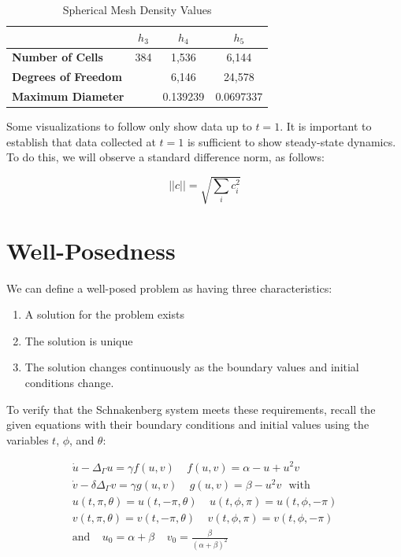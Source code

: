 \documentclass[12pt]{article}
\begin{document}
\begin{table}[H]
	\centering
	\caption{Spherical Mesh Density Values}\label{tab:refine}
	\begin{tabular}{|l|c|c|c|}
		\hline
		\textbf{}                   & $h_3$ & $h_4$    & $h_5$     \\ \hline
		\textbf{Number of Cells}    & 384   & 1,536    & 6,144     \\ \hline
		\textbf{Degrees of Freedom} &       & 6,146    & 24,578    \\ \hline
		\textbf{Maximum Diameter}   &       & 0.139239 & 0.0697337 \\ \hline
	\end{tabular}
\end{table}

Some visualizations to follow only show data up to $t=1$. It is important to establish that data collected at $t=1$ is sufficient to show steady-state dynamics. To do this, we will observe a standard difference norm, as follows:

\begin{equation}\label{eq:norm_standard}
	||c|| = \sqrt{\sum_i c_i^2}
\end{equation}


\section{Well-Posedness}

We can define a well-posed problem as having three characteristics:

\begin{enumerate}
	\item A solution for the problem exists
	\item The solution is unique
	\item The solution changes continuously as the boundary values and initial conditions change.
\end{enumerate}

To verify that the Schnakenberg system meets these requirements, recall the given equations with their boundary conditions and initial values using the variables $t$, $\phi$, and $\theta$:

\begin{equation}
	\begin{aligned}
		\dot{u} - \Delta_\Gamma u = \gamma f(u,v) ~~~~~ f(u,v) = \alpha - u + u^2v ~~~\\
		\dot{v} - \delta\Delta_\Gamma v = \gamma g(u, v) ~~~~~ g(u, v) = \beta - u^2v ~~~ \text{with}\\
		u(t,\pi, \theta) = u(t, -\pi, \theta) ~~~~~ u(t, \phi, \pi) = u(t, \phi, -\pi) \\
		v(t,\pi, \theta) = v(t, -\pi, \theta) ~~~~~ v(t, \phi, \pi) = v(t, \phi, -\pi)	\\
		\text{and} ~~~~~ u_0 = \alpha + \beta ~~~~~ v_0 = \frac{\beta}{(\alpha+\beta)^2}~~~~~~
	\end{aligned}
\end{equation}
\end{document}
